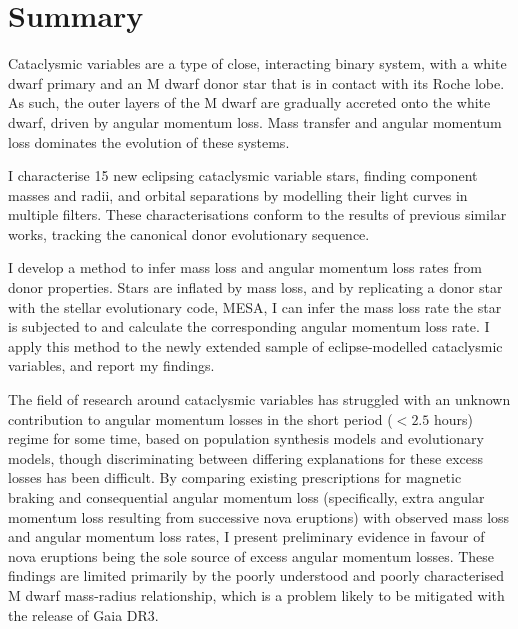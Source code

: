 \chapter*{Summary}

Cataclysmic variables are a type of close, interacting binary system, with a white dwarf primary and an M dwarf donor star that is in contact with its Roche lobe. As such, the outer layers of the M dwarf are gradually accreted onto the white dwarf, driven by angular momentum loss. Mass transfer and angular momentum loss dominates the evolution of these systems.

I characterise 15 new eclipsing cataclysmic variable stars, finding component masses and radii, and orbital separations by modelling their light curves in multiple filters. These characterisations conform to the results of previous similar works, tracking the canonical donor evolutionary sequence.

I develop a method to infer mass loss and angular momentum loss rates from donor properties. Stars are inflated by mass loss, and by replicating a donor star with the stellar evolutionary code, MESA, I can infer the mass loss rate the star is subjected to and calculate the corresponding angular momentum loss rate. I apply this method to the newly extended sample of eclipse-modelled cataclysmic variables, and report my findings.

The field of research around cataclysmic variables has struggled with an unknown contribution to angular momentum losses in the short period ($<2.5$ hours) regime for some time, based on population synthesis models and evolutionary models, though discriminating between differing explanations for these excess losses has been difficult.
By comparing existing prescriptions for magnetic braking and consequential angular momentum loss (specifically, extra angular momentum loss resulting from successive nova eruptions) with observed mass loss and angular momentum loss rates, I present preliminary evidence in favour of nova eruptions being the sole source of excess angular momentum losses.
These findings are limited primarily by the poorly understood and poorly characterised M dwarf mass-radius relationship, which is a problem likely to be mitigated with the release of Gaia DR3.